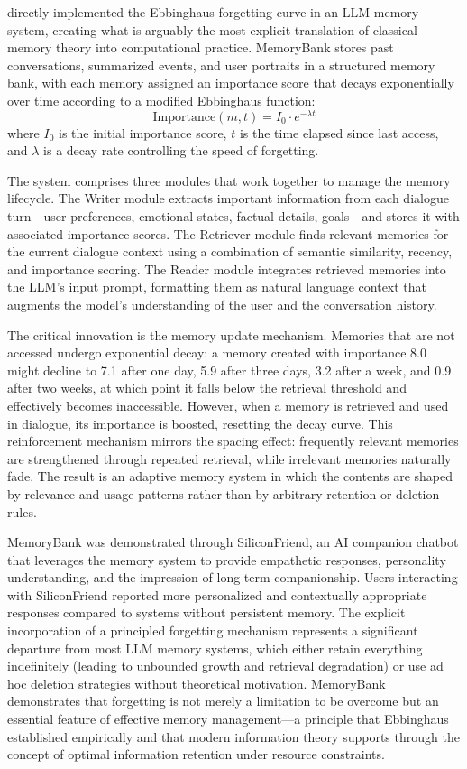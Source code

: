 \citet{zhong2024memorybank} directly implemented the Ebbinghaus forgetting curve in an LLM memory system, creating what is arguably the most explicit translation of classical memory theory into computational practice. MemoryBank stores past conversations, summarized events, and user portraits in a structured memory bank, with each memory assigned an importance score that decays exponentially over time according to a modified Ebbinghaus function:
\begin{equation}
\text{Importance}(m, t) = I_0 \cdot e^{-\lambda t}
\end{equation}
where $I_0$ is the initial importance score, $t$ is the time elapsed since last access, and $\lambda$ is a decay rate controlling the speed of forgetting.

The system comprises three modules that work together to manage the memory lifecycle. The Writer module extracts important information from each dialogue turn---user preferences, emotional states, factual details, goals---and stores it with associated importance scores. The Retriever module finds relevant memories for the current dialogue context using a combination of semantic similarity, recency, and importance scoring. The Reader module integrates retrieved memories into the LLM's input prompt, formatting them as natural language context that augments the model's understanding of the user and the conversation history.

The critical innovation is the memory update mechanism. Memories that are not accessed undergo exponential decay: a memory created with importance 8.0 might decline to 7.1 after one day, 5.9 after three days, 3.2 after a week, and 0.9 after two weeks, at which point it falls below the retrieval threshold and effectively becomes inaccessible. However, when a memory is retrieved and used in dialogue, its importance is boosted, resetting the decay curve. This reinforcement mechanism mirrors the spacing effect: frequently relevant memories are strengthened through repeated retrieval, while irrelevant memories naturally fade. The result is an adaptive memory system in which the contents are shaped by relevance and usage patterns rather than by arbitrary retention or deletion rules.

MemoryBank was demonstrated through SiliconFriend, an AI companion chatbot that leverages the memory system to provide empathetic responses, personality understanding, and the impression of long-term companionship. Users interacting with SiliconFriend reported more personalized and contextually appropriate responses compared to systems without persistent memory. The explicit incorporation of a principled forgetting mechanism represents a significant departure from most LLM memory systems, which either retain everything indefinitely (leading to unbounded growth and retrieval degradation) or use ad hoc deletion strategies without theoretical motivation. MemoryBank demonstrates that forgetting is not merely a limitation to be overcome but an essential feature of effective memory management---a principle that Ebbinghaus established empirically and that modern information theory supports through the concept of optimal information retention under resource constraints.

